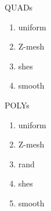 \documentclass[preprint,10pt]{elsarticle}
\begin{document}
QUADs
\begin{enumerate}
	\item uniform
	\item Z-mesh
	\item shes
	\item smooth
\end{enumerate}

POLYs
\begin{enumerate}
	\item uniform
	\item Z-mesh
	\item rand
	\item shes
	\item smooth
\end{enumerate}
\end{document}
